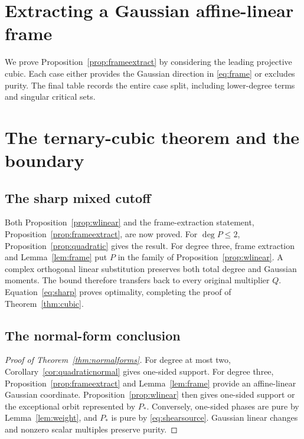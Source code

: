 \documentclass[11pt]{article}
\theoremstyle{definition}\newtheorem{definition}[theorem]{Definition}
\theoremstyle{remark}\newtheorem{remark}[theorem]{Remark}
\begin{document}



\section{Extracting a Gaussian affine-linear frame}
\label{sec:frameextraction}
We prove Proposition~\ref{prop:frameextract} by considering the leading
projective cubic. Each case either provides the Gaussian direction in
\eqref{eq:frame} or excludes purity. The final table records the entire
case split, including lower-degree terms and singular critical sets.



\section{The ternary-cubic theorem and the boundary}\label{sec:completion}

\subsection{The sharp mixed cutoff}
Both Proposition~\ref{prop:wlinear} and the frame-extraction statement,
Proposition~\ref{prop:frameextract}, are now proved.
For $\deg P\leq2$, Proposition~\ref{prop:quadratic} gives the result.
For degree three, frame extraction and Lemma~\ref{lem:frame} put $P$
in the family of Proposition~\ref{prop:wlinear}. A complex orthogonal
linear substitution preserves both total degree and Gaussian moments.
The bound therefore transfers back to every original multiplier $Q$.
Equation~\eqref{eq:sharp} proves optimality, completing the proof of
Theorem~\ref{thm:cubic}.

\subsection{The normal-form conclusion}
\begin{proof}[Proof of Theorem~\ref{thm:normalforms}]
For degree at most two, Corollary~\ref{cor:quadraticnormal} gives
one-sided support. For degree three, Proposition~\ref{prop:frameextract}
and Lemma~\ref{lem:frame} provide an affine-linear Gaussian coordinate.
Proposition~\ref{prop:wlinear} then gives one-sided support or the
exceptional orbit represented by $P_*$. Conversely, one-sided phases
are pure by Lemma~\ref{lem:weight}, and $P_*$ is pure by
\eqref{eq:shearsource}. Gaussian linear changes and nonzero scalar
multiples preserve purity.
\end{proof}
\end{document}
